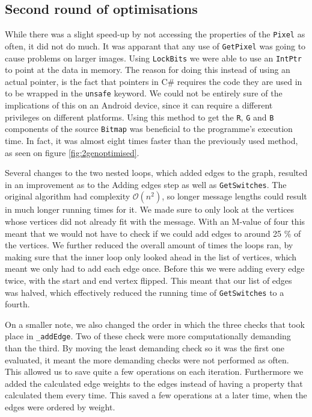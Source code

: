 \subsection{Second round of optimisations}
While there was a slight speed-up by not accessing the properties of the \lstinline|Pixel| as often, it did not do much.
It was apparant that any use of \lstinline|GetPixel| was going to cause problems on larger images.
Using \lstinline|LockBits| we were able to use an \lstinline|IntPtr| to point at the data in memory. \citep{MSDNIntPtr}
The reason for doing this instead of using an actual pointer, is the fact that pointers in C\# requires the code they are used in to be wrapped in the \lstinline|unsafe| keyword. 
We could not be entirely sure of the implications of this on an Android device, since it can require a different privileges on different platforms.
Using this method to get the \lstinline|R|, \lstinline|G| and \lstinline|B| components of the source \lstinline|Bitmap| was beneficial to the programme's execution time.
In fact, it was almost eight times faster than the previously used method, as seen on figure \ref{fig:2genoptimised}.

Several changes to the two nested loops, which added edges to the graph, resulted in an improvement as to the Adding edges step as well as \lstinline|GetSwitches|.
The original algorithm had complexity $\mathcal{O}(n^2)$, so longer message lengths could result in much longer running times for it.
We made sure to only look at the vertices whose vertices did not already fit with the message.
With an M-value of four this meant that we would not have to check if we could add edges to around 25 \% of the vertices.
We further reduced the overall amount of times the loops ran, by making sure that the inner loop only looked ahead in the list of vertices, which meant we only had to add each edge once.
Before this we were adding every edge twice, with the start and end vertex flipped.
This meant that our list of edges was halved, which effectively reduced the running time of \lstinline|GetSwitches| to a fourth.

On a smaller note, we also changed the order in which the three checks that took place in \lstinline|_addEdge|.
Two of these check were more computationally demanding than the third.
By moving the least demanding check so it was the first one evaluated, it meant the more demanding checks were not performed as often.
This allowed us to save quite a few operations on each iteration.
Furthermore we added the calculated edge weights to the edges instead of having a property that calculated them every time.
This saved a few operations at a later time, when the edges were ordered by weight.

